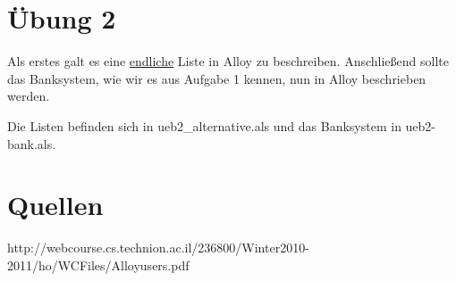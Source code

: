 \documentclass{fm}
\begin{document}
\section*{Übung 2}
Als erstes galt es eine \underline{endliche} Liste in Alloy zu beschreiben. Anschließend sollte das Banksystem, wie wir es aus Aufgabe 1 kennen, nun in Alloy beschrieben werden.

Die Listen befinden sich in \glqq{}ueb2\_alternative.als\grqq{} und das Banksystem in \glqq{}ueb2-bank.als\grqq{}.

\section*{Quellen}
http://webcourse.cs.technion.ac.il/236800/Winter2010-2011/ho/WCFiles/Alloyusers.pdf
\end{document}
